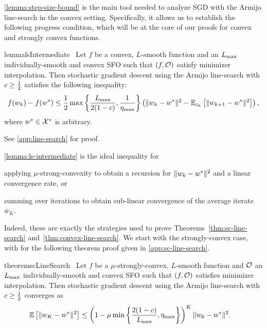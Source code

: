 \autoref{lemma:step-size-bound} is the main tool needed to analyze \ac{SGD} with the Armijo line-search in the convex setting.
Specifically, it allows us to establish the following progress condition, which will be at the core of our proofs for convex and strongly convex functions. 
\begin{restatable}{lemma}{lsIntermediate}~\label{lemma:ls-intermediate}
    Let \( f \) be a convex, \( L \)-smooth function and \oracle{} an \( \Lmax \) individually-smooth and convex \ac{SFO} such that \( \rbr{f, \oracle{}} \) satisfy minimizer interpolation.
    Then stochastic gradient descent using the Armijo line-search with \( c \geq \half \) satisfies the following
    inequality:
    \[ f(\wk)- f(\wopt) \leq \half \max\cbr{\frac{\Lmax}{2(1-c)},\inv{\etamax}} \rbr{\norm{\wk - \wopt}^2 - \E_{\zk}\sbr{\norm{\wkk - \wopt}^2}}, \]
    where \( \wopt \in \calX^* \) is arbitrary.
\end{restatable}
\noindent See \autoref{app:line-search} for proof. \hfill \break

\autoref{lemma:ls-intermediate} is the ideal inequality for 
\begin{inparaenum}[(a)]
    \item applying \( \mu \)-strong-convexity to obtain a recursion for \( \norm{\wk - \wopt}^2 \) and  a linear convergence rate, or
    \item summing over iterations to obtain sub-linear convergence of the average iterate \( \bar w_K \).
\end{inparaenum}
Indeed, these are exactly the strategies used to prove Theorems~\ref{thm:sc-line-search} and~\ref{thm:convex-line-search}.
We start with the strongly-convex case, with for the following theorem proof given in \autoref{app:sc-line-search}.

\begin{restatable}{theorem}{scLineSearch}~\label{thm:sc-line-search}
    Let \( f \) be a \( \mu \)-strongly-convex, \( L \)-smooth function and \( \oracle{} \) an \( \Lmax \) individually-smooth and convex \ac{SFO} such that \( \rbr{f, \oracle{}} \) satisfies minimizer interpolation.
    Then stochastic gradient descent using the Armijo line-search with \( c \geq \half \) converges as
    \begin{align*}
        \E\sbr{\norm{\w_{K} - \wopt}^2} &\leq \rbr{1 - \mu \min\cbr{\frac{2(1-c)}{\Lmax}, \etamax}}^K \norm{\w_0 - \wopt}^2. 
    \end{align*}
\end{restatable}%

